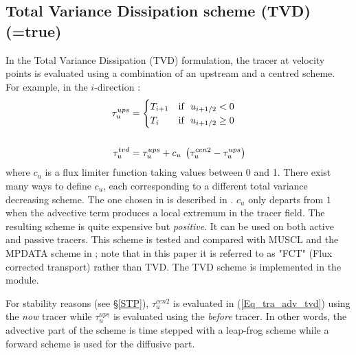 \subsection   [Total Variance Dissipation scheme (TVD) (\np{ln\_traadv\_tvd})]
			{Total Variance Dissipation scheme (TVD) (=true)}
\label{TRA_adv_tvd}

In the Total Variance Dissipation (TVD) formulation, the tracer at velocity 
points is evaluated using a combination of an upstream and a centred scheme. 
For example, in the $i$-direction :
\begin{equation} \label{Eq_tra_adv_tvd}
\begin{split}
\tau _u^{ups}&= \begin{cases}
 					T_{i+1} 	& \text{if $\ u_{i+1/2} <     0$} \hfill \\
 					T_i   		& \text{if $\ u_{i+1/2} \geq 0$} \hfill \\
				  \end{cases}     \\
\\
\tau _u^{tvd}&=\tau _u^{ups} +c_u \;\left( {\tau _u^{cen2} -\tau _u^{ups} } \right)
\end{split}
\end{equation}
where $c_u$ is a flux limiter function taking values between 0 and 1. 
There exist many ways to define $c_u$, each corresponding to a different 
total variance decreasing scheme. The one chosen in \NEMO is described in 
\citet{Zalesak_JCP79}. $c_u$ only departs from $1$ when the advective term 
produces a local extremum in the tracer field. The resulting scheme is quite 
expensive but \emph{positive}. It can be used on both active and passive tracers. 
This scheme is tested and compared with MUSCL and the MPDATA scheme in 
\citet{Levy_al_GRL01}; note that in this paper it is referred to as "FCT" (Flux corrected 
transport) rather than TVD. The TVD scheme is implemented in the  module.

For stability reasons (see \S\ref{STP}),
$\tau _u^{cen2}$ is evaluated  in (\ref{Eq_tra_adv_tvd}) using the \textit{now} tracer while $\tau _u^{ups}$ 
is evaluated using the \textit{before} tracer. In other words, the advective part of 
the scheme is time stepped with a leap-frog scheme while a forward scheme is 
used for the diffusive part. 

